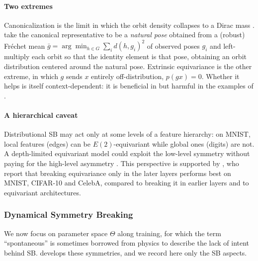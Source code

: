 \documentclass[mathematics,review,submit,moreauthors]{Definitions/mdpi}
\begin{document}
\paragraph{Two extremes}
Canonicalization is the limit in which the orbit density collapses to a Dirac mass \citep{ciuclea2025,urbano2026}.
\citet{urbano2026} take the canonical representative to be a \emph{natural pose} obtained from a (robust) Fréchet mean $\bar g=\arg\min_{h\in G}\sum_{i}d(h,g_i)^2$ of observed poses $g_i$ and left-multiply each orbit so that the identity element is that pose, obtaining an orbit distribution centered around the natural pose.
Extrinsic equivariance is the other extreme, in which $g$ sends $x$ entirely off-distribution, $p(gx)=0$.
Whether it helps is itself context-dependent: it is beneficial in \citet{wang2022b} but harmful in the examples of \citet{wang2023a}.

\paragraph{A hierarchical caveat}
Distributional SB may act only at some levels of a feature hierarchy: on MNIST, local features (edges) can be $E(2)$-equivariant while global ones (digits) are not.
A depth-limited equivariant model could exploit the low-level symmetry without paying for the high-level asymmetry \citep[Fig.~2c]{weiler2019anips}.
This perspective is supported by \citet{elsayed2020p3icml}, who report that breaking equivariance only in the later layers performs best on MNIST, CIFAR-10 and CelebA, compared to breaking it in earlier layers and to equivariant architectures.

\subsubsection{Dynamical Symmetry Breaking}\label{sec:dynamical-sb}
We now focus on parameter space $\Theta$ along training, for which the term ``spontaneous'' is sometimes borrowed from physics to describe the lack of intent behind SB.
 develops these symmetries, and we record here only the SB aspects.
\end{document}

